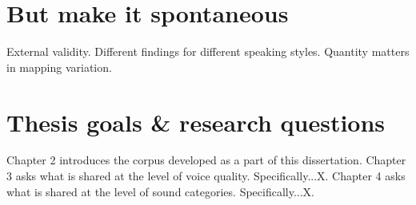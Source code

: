 \section{But make it spontaneous}
External validity.
Different findings for different speaking styles.
Quantity matters in mapping variation.

\section{Thesis goals \& research questions}
Chapter 2 introduces the corpus developed as a part of this dissertation.
Chapter 3 asks what is shared at the level of voice quality. Specifically...X.
Chapter 4 asks what is shared at the level of sound categories. Specifically...X.


\endinput %
